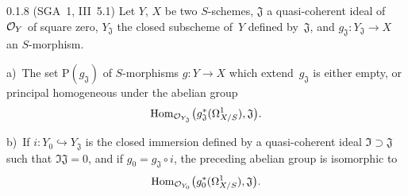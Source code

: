 \begin{theorem}{0.1.8}
\label{III.0.1.8}
(SGA~1, III~5.1)%
{\renewcommand{\thefootnote}{(13)}}
Let \(Y\), \(X\) be two \(S\)-schemes, \(\mathfrak{J}\) a quasi-coherent
ideal of~\(\mathcal{O}_Y\) of square zero, \(Y_{\mathfrak{J}}\) the closed subscheme
of~\(Y\) defined by~\(\mathfrak{J}\), and
\(g_{\mathfrak{J}}\colon Y_{\mathfrak{J}}\to X\) an \(S\)-morphism.

a)~The set \(\mathrm{P}(g_{\mathfrak{J}})\) of \(S\)-morphisms
\(g\colon Y\to X\) which extend~\(g_{\mathfrak{J}}\) is either empty, or
principal homogeneous under the abelian group
\[
\operatorname{Hom}_{\mathcal{O}_{Y_{\mathfrak{J}}}}
\bigl(g_{\mathfrak{J}}^{*}(\Omega^1_{X/S}),\mathfrak{J}\bigr).
\]

b)~If \(i\colon Y_0\hookrightarrow Y_{\mathfrak{J}}\) is the closed
immersion defined by a quasi-coherent ideal
\(\mathfrak{I}\supset\mathfrak{J}\) such that
\(\mathfrak{I}\mathfrak{J}=0\), and if
\(g_0=g_{\mathfrak{J}}\circ i\), the preceding abelian group is
isomorphic to
\[
\operatorname{Hom}_{\mathcal{O}_{Y_0}}
\bigl(g_0^{*}(\Omega^1_{X/S}),\mathfrak{J}\bigr).
\]
\end{theorem}


